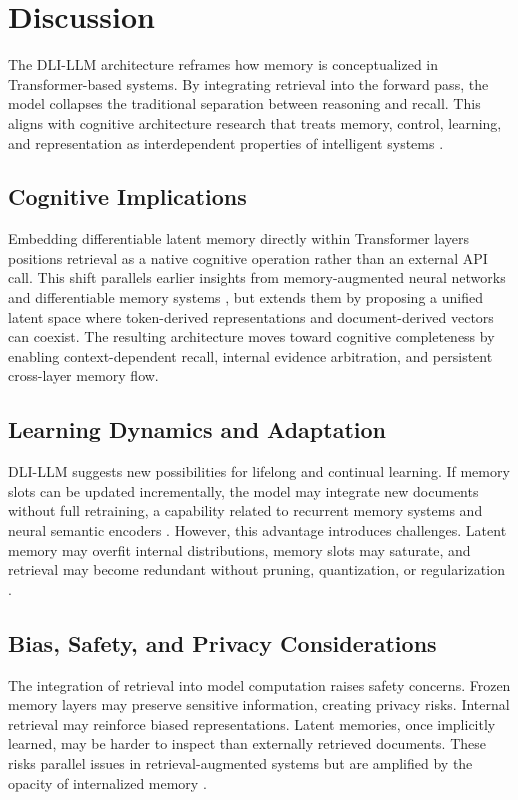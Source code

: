 \section{Discussion}
The DLI-LLM architecture reframes how memory is conceptualized in Transformer-based systems. By integrating retrieval into the forward pass, the model collapses the traditional separation between reasoning and recall. This aligns with cognitive architecture research that treats memory, control, learning, and representation as interdependent properties of intelligent systems \cite{Sun2004}.

\subsection{Cognitive Implications}
Embedding differentiable latent memory directly within Transformer layers positions retrieval as a native cognitive operation rather than an external API call. This shift parallels earlier insights from memory-augmented neural networks and differentiable memory systems \cite{Graves2014,Graves2016,Santoro2016}, but extends them by proposing a unified latent space where token-derived representations and document-derived vectors can coexist. The resulting architecture moves toward cognitive completeness by enabling context-dependent recall, internal evidence arbitration, and persistent cross-layer memory flow.

\subsection{Learning Dynamics and Adaptation}
DLI-LLM suggests new possibilities for lifelong and continual learning. If memory slots can be updated incrementally, the model may integrate new documents without full retraining, a capability related to recurrent memory systems and neural semantic encoders \cite{Bulatov2022,Munkhdalai2017}. However, this advantage introduces challenges. Latent memory may overfit internal distributions, memory slots may saturate, and retrieval may become redundant without pruning, quantization, or regularization \cite{Jgou2011,Johnson2021}.

\subsection{Bias, Safety, and Privacy Considerations}
The integration of retrieval into model computation raises safety concerns. Frozen memory layers may preserve sensitive information, creating privacy risks. Internal retrieval may reinforce biased representations. Latent memories, once implicitly learned, may be harder to inspect than externally retrieved documents. These risks parallel issues in retrieval-augmented systems but are amplified by the opacity of internalized memory \cite{Lewis2021}.

